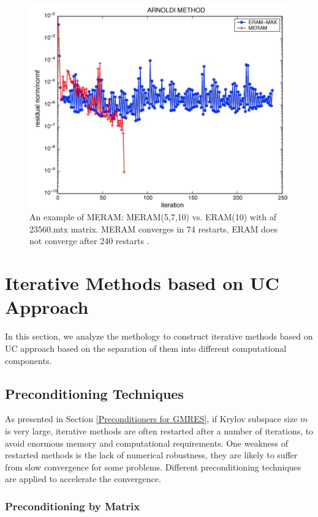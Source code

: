 \begin{figure}[t]
	\centering
	\includegraphics[width=6.2in]{fig/meram_perf.png}
	\caption{An example of MERAM: MERAM(5,7,10) vs. ERAM(10) with af 23560.mtx matrix. MERAM converges in 74 restarts, ERAM does not converge after 240 restarts \cite{emad2005multiple}.}
	\label{meram-perf}
\end{figure}

\section{Iterative Methods based on UC Approach}

In this section, we analyze the methology to construct iterative methods based on UC approach based on the separation of them into different computational components.

\subsection{Preconditioning Techniques}

As presented in Section \ref{Preconditioners for GMRES}, if Krylov subspace size $m$ is very large, iterative methods are often restarted after a number of iterations, to avoid enormous memory and computational requirements. One weakness of restarted methods is the lack of numerical robustness, they are likely to suffer from slow convergence for some problems. Different preconditioning techniques are applied to accelerate the convergence.

\subsubsection{Preconditioning by Matrix}

